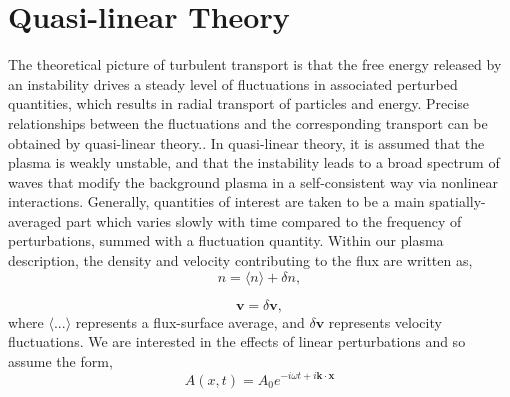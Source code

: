 \documentclass[12pt]{article}
\numberwithin{equation}{subsection}
\begin{document}
\section{Quasi-linear Theory}
   \quad The theoretical picture of turbulent transport is that the free energy released by an instability drives a steady level of
fluctuations in associated perturbed quantities, which results in radial transport of particles and energy. Precise relationships
between the fluctuations and the corresponding transport can be obtained by quasi-linear theory.\cite{WessonC}. In quasi-linear
theory, it is assumed that the plasma is weakly unstable, and that the instability leads to a broad spectrum of waves that modify
the background plasma in a self-consistent way via nonlinear interactions\cite{GurnBhatA}. Generally, quantities of interest are taken
to be a main spatially-averaged part which varies slowly with time compared to the frequency of perturbations, summed with a fluctuation
quantity. Within our plasma description, the density and velocity contributing to the flux are written as, 
   \begin{equation}
      n = \langle n \rangle + \delta n,
   \end{equation}

   \begin{equation}
      \bm{v} = \delta \bm{v},
   \end{equation}
where $\langle ... \rangle$ represents a flux-surface average, and $\delta \bm{v}$ represents velocity fluctuations. We are interested in
the effects of linear perturbations and so assume the form,   
   \begin{equation}
      A(x,t) = A_0e^{-i\omega t + i\bm{k}\cdot\bm{x}} 
   \end{equation}
\end{document}
